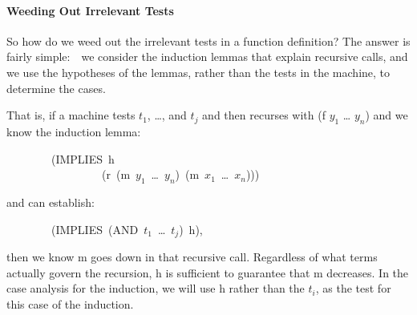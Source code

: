 \documentclass[11pt]{book}
\newenvironment{pubasis}{\begin{flushleft}\ttfamily\small}{\normalsize\rmfamily\end{flushleft}}
\newcommand{\pubdefaulttextsize}{\large}
\begin{document}
\paragraph{Weeding Out Irrelevant Tests}
\pubdefaulttextsize
So how do we weed out the irrelevant tests in a function definition?
The answer is fairly simple:~~we consider the induction lemmas that
explain recursive calls,
and we  use the hypotheses of the lemmas,
rather than the tests in the machine,
to determine the cases.

That is, if a machine tests $t_{1}$, \ldots{}, and $t_{j}$ and then recurses
with (f $y_{1}$ \ldots{} $y_{n}$) and we know the induction lemma:
\begin{pubasis}
~~~~~~~~(IMPLIES~h\\
~~~~~~~~~~~~~~~~~(r~(m~$y_{1}$~\ldots{}~$y_{n}$)~(m~$x_{1}$~\ldots{}~$x_{n}$)))\\
\end{pubasis}
and can establish:
\begin{pubasis}
~~~~~~~~(IMPLIES~(AND~$t_{1}$~\ldots{}~$t_{j}$)~h),\\
\end{pubasis}
then we know m goes down in that recursive call.  Regardless of what
terms actually govern the recursion, h is sufficient to guarantee
that m decreases.  In the
case analysis for the induction, we will use h rather than the $t_{i}$,
as the test for this case of the induction.
\end{document}
